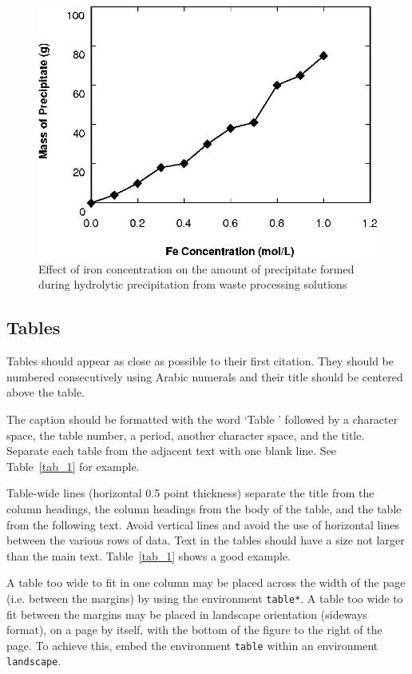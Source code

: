 \documentclass[a4paper, times, 10pt, twocolumn, twoside]{article}
\begin{document}
\begin{figure}[!htb]
    \centering
    \includegraphics[width=\textwidth]{ISARC_ExampleFigure.eps}
    \caption{Effect of iron concentration on the amount of precipitate formed during hydrolytic precipitation from waste processing solutions}
    \label{fig_2}
\end{figure}


\subsection{Tables}

Tables should appear as close as possible to their first citation. 
They should be numbered consecutively using Arabic numerals and their title should be centered above the table.

The caption should be formatted with the word `Table ' followed by a character space, the table number, a period, another character space, and the title. 
Separate each table from the adjacent text with one blank line.
See Table~\ref{tab_1} for example.

Table-wide lines (horizontal 0.5 point thickness) separate the title from the column headings, the column headings from the body of the table, and the table from the following text. 
Avoid vertical lines and avoid the use of horizontal lines between the various rows of data.
Text in the tables should have a size not larger than the main text.
Table~\ref{tab_1} shows a good example.

A table too wide to fit in one column may be placed across the width of the page (i.e. between the margins) by using the environment \verb|table*|. 
A table too wide to fit between the margins may be placed in landscape orientation (sideways format), on a page by itself, with the bottom of the figure to the right of the page.
To achieve this, embed the environment \verb|table| within an environment \verb|landscape|.
\end{document}
